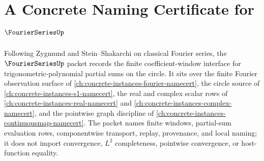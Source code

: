 \chapter{A Concrete Naming Certificate for $\FourierSeriesUp$}
\label{ch:concrete-instances-fourier-series-namecert}

Following Zygmund and Stein--Shakarchi on classical Fourier series, the $\FourierSeriesUp$ packet records the finite coefficient-window interface for trigonometric-polynomial partial sums on the circle. It sits over the finite Fourier observation surface of \autoref{ch:concrete-instances-fourier-namecert}, the circle source of \autoref{ch:concrete-instances-s1-namecert}, the real and complex scalar rows of \autoref{ch:concrete-instances-real-namecert} and \autoref{ch:concrete-instances-complex-namecert}, and the pointwise graph discipline of \autoref{ch:concrete-instances-continuousmap-namecert}. The packet names finite windows, partial-sum evaluation rows, componentwise transport, replay, provenance, and local naming; it does not import convergence, $L^{2}$ completeness, pointwise convergence, or host-function equality.

